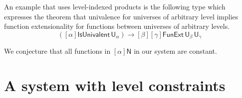 \documentclass[11pt,a4paper]{article}
\theoremstyle{definition}
\newcommand{\NN}{\mathsf{N}}
\newcommand{\UU}{\mathsf{U}}
\begin{document}
An example that uses level-indexed products is the following type which  expresses the theorem that univalence for universes of arbitrary level implies function extensionality for functions between universes of arbitrary levels.
$$
([\alpha]\mathsf{IsUnivalent}\, \UU_\alpha)
\to [\beta][\gamma] \mathsf{FunExt}\, \UU_\beta\, \UU_\gamma
$$

We conjecture that all functions in $[\alpha]\NN$ in our system
are constant.



\section{A system with level constraints}\label{sec:constraints}
\end{document}
